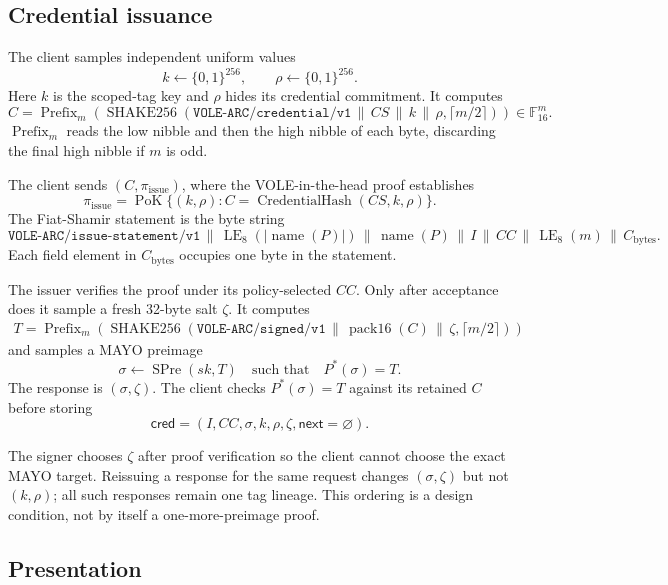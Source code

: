 \documentclass[11pt]{article}
\newcommand{\concat}{\,\|\,}
\newcommand{\F}{\mathbb{F}_{16}}
\newcommand{\LE}[1]{\operatorname{LE}_{#1}}
\newcommand{\XOF}{\operatorname{SHAKE256}}
\newcommand{\Prefix}{\operatorname{Prefix}}
\newcommand{\pack}{\operatorname{pack16}}
\newcommand{\PoK}{\operatorname{PoK}}
\newcommand{\domain}[1]{\texttt{#1}}
\theoremstyle{remark}
\begin{document}
\subsection{Credential issuance}

The client samples independent uniform values
\[
  k \leftarrow {\{0,1\}}^{256},
  \qquad
  \rho \leftarrow {\{0,1\}}^{256}.
\]
Here $k$ is the scoped-tag key and $\rho$ hides its credential commitment.
It computes
\[
  C = \Prefix_m\!\left(
      \XOF(\domain{VOLE-ARC/credential/v1}
           \concat CS \concat k \concat \rho,\lceil m/2\rceil)
      \right) \in \F^m .
\]
$\Prefix_m$ reads the low nibble and then the high nibble of each byte,
discarding the final high nibble if $m$ is odd.

The client sends $(C,\pi_{\mathrm{issue}})$, where the VOLE-in-the-head proof
establishes
\[
  \pi_{\mathrm{issue}} =
  \PoK\{(k,\rho): C =
  \operatorname{CredentialHash}(CS,k,\rho)\}.
\]
The Fiat-Shamir statement is the byte string
\[
  \domain{VOLE-ARC/issue-statement/v1} \concat
  \LE{8}(|\operatorname{name}(P)|) \concat \operatorname{name}(P) \concat
  I \concat CC \concat \LE{8}(m) \concat C_{\mathrm{bytes}}.
\]
Each field element in $C_{\mathrm{bytes}}$ occupies one byte in the statement.

The issuer verifies the proof under its policy-selected $CC$. Only after
acceptance does it sample a fresh 32-byte salt $\zeta$. It computes
\begin{align*}
  T = \Prefix_m\!\left(
      \XOF(\domain{VOLE-ARC/signed/v1}
           \concat \pack(C) \concat \zeta,\lceil m/2\rceil)
      \right)
\end{align*}
and samples a MAYO preimage
\[
  \sigma \leftarrow \operatorname{SPre}(sk,T)
  \quad\text{such that}\quad P^*(\sigma)=T.
\]
The response is $(\sigma,\zeta)$. The client checks $P^*(\sigma)=T$ against
its retained $C$ before storing
\[
  \mathsf{cred}=(I,CC,\sigma,k,\rho,\zeta,\mathsf{next}=\varnothing).
\]

The signer chooses $\zeta$ after proof verification so the client cannot
choose the exact MAYO target. Reissuing a response for the same request
changes $(\sigma,\zeta)$ but not $(k,\rho)$; all such responses remain one
tag lineage. This ordering is a design condition, not by itself a
one-more-preimage proof.

\subsection{Presentation}
\end{document}
